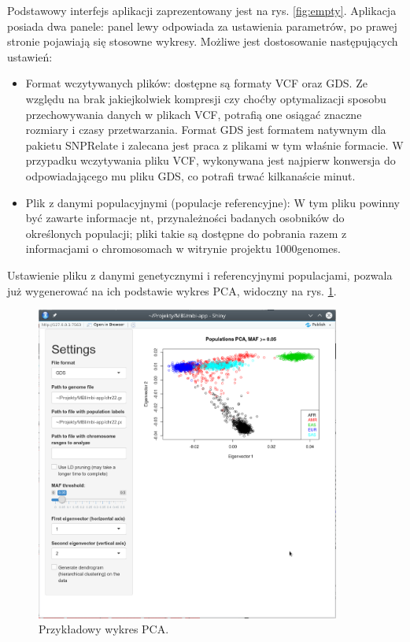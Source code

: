 \documentclass[a4paper]{article}
\begin{document}
Podstawowy interfejs aplikacji zaprezentowany jest na rys. \ref{fig:empty}. Aplikacja posiada dwa panele: panel lewy odpowiada za ustawienia parametrów, po prawej stronie pojawiają się stosowne wykresy. Możliwe jest dostosowanie następujących ustawień:
\begin{itemize}
\item Format wczytywanych plików: dostępne są formaty VCF oraz GDS. Ze względu na brak jakiejkolwiek kompresji czy choćby optymalizacji sposobu przechowywania danych w plikach VCF, potrafią one osiągać znaczne rozmiary i czasy przetwarzania. Format GDS jest formatem natywnym dla pakietu SNPRelate i zalecana jest praca z plikami w tym właśnie formacie. W przypadku wczytywania pliku VCF, wykonywana jest najpierw konwersja do odpowiadającego mu pliku GDS, co potrafi trwać kilkanaście minut. 
\item Plik z danymi populacyjnymi (populacje referencyjne): W tym pliku powinny być zawarte informacje nt, przynależności badanych osobników do określonych populacji; pliki takie są dostępne do pobrania razem z informacjami o chromosomach w witrynie projektu 1000genomes. 
\end{itemize}
Ustawienie pliku z danymi genetycznymi i referencyjnymi populacjami, pozwala już wygenerować na ich podstawie wykres PCA, widoczny na rys. \ref{fig:pca}. 

\begin{figure}
\centering \includegraphics[width=10cm]{example-pca.png}
\caption{Przykładowy wykres PCA.} \label{fig:pca}
\end{figure}
\end{document}
